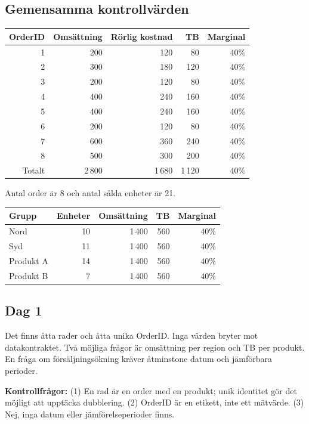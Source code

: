 \documentclass[11pt,a4paper]{article}
\begin{document}
\subsection{Gemensamma kontrollvärden}
\begin{center}
\begin{tabular}{rrrrr}
\toprule
OrderID & Omsättning & Rörlig kostnad & TB & Marginal\\
\midrule
1 & 200 & 120 & 80 & 40\%\\
2 & 300 & 180 & 120 & 40\%\\
3 & 200 & 120 & 80 & 40\%\\
4 & 400 & 240 & 160 & 40\%\\
5 & 400 & 240 & 160 & 40\%\\
6 & 200 & 120 & 80 & 40\%\\
7 & 600 & 360 & 240 & 40\%\\
8 & 500 & 300 & 200 & 40\%\\
\midrule
Totalt & 2\,800 & 1\,680 & 1\,120 & 40\%\\
\bottomrule
\end{tabular}
\end{center}
Antal order är 8 och antal sålda enheter är 21.
\begin{center}
\begin{tabular}{lrrrr}
\toprule
Grupp & Enheter & Omsättning & TB & Marginal\\
\midrule
Nord & 10 & 1\,400 & 560 & 40\%\\
Syd & 11 & 1\,400 & 560 & 40\%\\
Produkt A & 14 & 1\,400 & 560 & 40\%\\
Produkt B & 7 & 1\,400 & 560 & 40\%\\
\bottomrule
\end{tabular}
\end{center}

\subsection{Dag 1}
Det finns åtta rader och åtta unika OrderID. Inga värden bryter mot datakontraktet. Två möjliga frågor är omsättning per region och TB per produkt. En fråga om försäljningsökning kräver åtminstone datum och jämförbara perioder.

\textbf{Kontrollfrågor:} (1) En rad är en order med en produkt; unik identitet gör det möjligt att upptäcka dubblering. (2) OrderID är en etikett, inte ett mätvärde. (3) Nej, inga datum eller jämförelseperioder finns.
\end{document}
